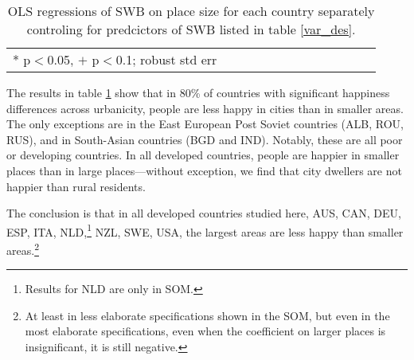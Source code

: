 \documentclass[10pt, letterpaper]{article}
\begin{document}
\begin{spacing}{.9} \begin{table}[H]\centering   \begin{scriptsize} \begin{tabular}{p{.5in}p{.5in}p{.5in}p{.5in}p{.5in}p{.5in}p{.5in}p{.5in}p{.5in}p{.5in}p{.5 in}p{.5in}p{.5 in}}\hline  \hline * p$<$0.05, $+$ p$<$0.1; robust std err \end{tabular}\end{scriptsize}\caption{\label{regression}OLS regressions of SWB on place size for each country separately controling for predcictors of SWB listed in table \ref{var_des}.%
}\end{table} \end{spacing}


The results in table \ref{regression} %
show that in 80\% of countries with significant happiness differences across
urbanicity, people are less happy in cities than in smaller areas. The only exceptions are in the East European Post Soviet countries (ALB, ROU, RUS), and in South-Asian countries (BGD and IND). Notably, these are all poor or developing countries. In all developed countries, people are happier in smaller places than in large places---without exception, we find that city dwellers are not happier than rural residents. 

%
The conclusion is that in all developed countries studied here, AUS, CAN, DEU, ESP, ITA,
NLD,\footnote{Results  for NLD are only in SOM.} NZL, SWE, USA,  the largest areas are less happy than smaller areas.\footnote{At least in less elaborate specifications shown in the SOM, but even in the most elaborate specifications, even when the coefficient on larger places is insignificant, it is still negative.}
\end{document}

